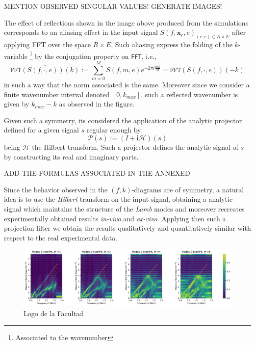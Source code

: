MENTION OBSERVED SINGULAR VALUES! GENERATE IMAGES!

The effect of reflections shown in the image above produced from the simulations corresponds to an aliasing effect in the input signal $S(f, \mathbf{x}_r, e)_{(r,e) \in R\times E}$ after applying FFT over the space $R \times E$. Such aliasing express the folding of the $k$-variable \footnote{Associated to the wavenumber} by the conjugation property on \texttt{FFT}, i.e., 
\begin{equation*}
    \overline{\texttt{FFT}(S(f, \cdot, e))(k)} := \sum_{m=0}^M S(f, m, e) \overline{e^{-2 \pi i \frac{m k}{M}}} = \texttt{FFT}(S(f, \cdot, e))(-k)
\end{equation*}
in such a way that the norm associated is the same. Moreover since we consider a finite wavenumber interval denoted $[0, k_{max}]$, such a reflected wavenumber is given by $k_{max}-k$ as observed in the figure.

Given such a symmetry, its considered the application of the analytic projector defined for a given signal $s$ regular enough by:
\begin{equation*}
    \mathcal{P}(s) := (I + \mathbf{i}\mathcal{H})(s)
\end{equation*}
being $\mathcal{H}$ the Hilbert transform. Such a projector defines the analytic signal of $s$ by constructing its real and imaginary parts.

ADD THE FORMULAS ASSOCIATED IN THE ANNEXED


Since the behavior observed in the $(f,k)$-diagrams are of symmetry, a natural idea is to use the \textit{Hilbert} transform on the input signal, obtaining a analytic signal which maintains the structure of the \textit{Lamb} modes and moreover recreates experimentally obtained results \textit{in-vivo} and \textit{ex-vivo}.
Applying then such a projection filter we obtain the results qualitatively and quantitatively similar with respect to the real experimental data.

\begin{figure}[!h]
	\centering
	\includegraphics[scale=.5]{images/TimeSingSous/2DTimeHilb_P7ElasticFK30M1460_y.pdf}
	\caption{Logo de la Facultad}
	\label{kdasldgdgf}
\end{figure} 

